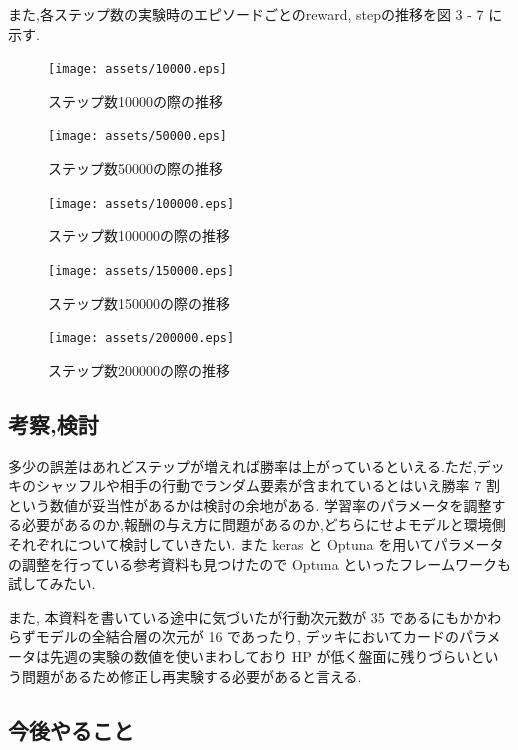 \documentclass{jarticle}     %
\begin{document}
  また,各ステップ数の実験時のエピソードごとのreward, stepの推移を図 3 - 7 に示す.

  \begin{figure}[htbp]
    \centering
    \texttt{[image: assets/10000.eps]}
    \caption{ステップ数10000の際の推移}
    \label{fig:10000}
  \end{figure}
  \begin{figure}[htbp]
    \centering
    \texttt{[image: assets/50000.eps]}
    \caption{ステップ数50000の際の推移}
    \label{fig:50000}
  \end{figure}
  \begin{figure}[htbp]
    \centering
    \texttt{[image: assets/100000.eps]}
    \caption{ステップ数100000の際の推移}
    \label{fig:100000}
  \end{figure}
  \begin{figure}[htbp]
    \centering
    \texttt{[image: assets/150000.eps]}
    \caption{ステップ数150000の際の推移}
    \label{fig:150000}
  \end{figure}
  \begin{figure}[htbp]
    \centering
    \texttt{[image: assets/200000.eps]}
    \caption{ステップ数200000の際の推移}
    \label{fig:200000}
  \end{figure}


\subsection{考察,検討}
多少の誤差はあれどステップが増えれば勝率は上がっているといえる.ただ,デッキのシャッフルや相手の行動でランダム要素が含まれているとはいえ勝率 7 割という数値が妥当性があるかは検討の余地がある.
学習率のパラメータを調整する必要があるのか,報酬の与え方に問題があるのか,どちらにせよモデルと環境側それぞれについて検討していきたい. また keras と Optuna を用いてパラメータの調整を行っている参考資料も見つけたので Optuna といったフレームワークも試してみたい\cite{Optuna}. \par
また, 本資料を書いている途中に気づいたが行動次元数が 35 であるにもかかわらずモデルの全結合層の次元が 16 であったり, デッキにおいてカードのパラメータは先週の実験の数値を使いまわしており HP が低く盤面に残りづらいという問題があるため修正し再実験する必要があると言える.

\subsection{今後やること}
\end{document}
